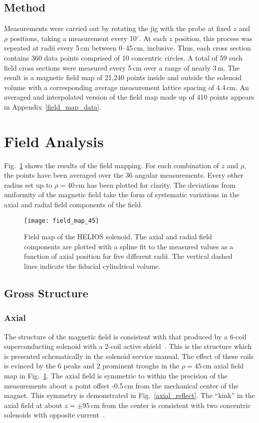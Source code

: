 \subsection{Method}
Measurements were carried out by rotating the jig with the probe at fixed $z$ and $\rho$ positions, taking a measurement every 10$^\circ$.  At each $z$ position, this process was repeated at radii every 5\,cm between 0--45\,cm, inclusive.  Thus, each cross section contains 360 data points comprised of 10 concentric circles.  A total of 59 such field cross sections were measured every 5\,cm over a range of nearly 3\,m.  The result is a magnetic field map of 21,240 points inside and outside the solenoid volume with a corresponding average measurement lattice spacing of 4.4\,cm.  An averaged and interpolated version of the field map made up of 410 points appears in Appendix~\ref{field_map_data}.
 
\section{Field Analysis}
Fig.~\ref{map} shows the results of the field mapping.  For each combination of $z$ and $\rho$, the points have been averaged over the 36 angular measurements.  Every other radius set up to $\rho=40$\,cm has been plotted for clarity.  The deviations from uniformity of the magnetic field take the form of systematic variations in the axial and radial field components of the field.    

\begin{figure}%
\centering
\texttt{[image: field\_map\_45]}%
\caption[Field map of the HELIOS solenoid]{Field map of the HELIOS solenoid.  The axial and radial field components are plotted with a spline fit to the measured values as a function of axial position for five different radii.  The vertical dashed lines indicate the fiducial cylindrical volume.}%
\label{map}%
\end{figure}

\subsection{Gross Structure}
\subsubsection{Axial}
The structure of the magnetic field is consistent with that produced by a 6-coil superconducting solenoid with a 2-coil active shield~\cite{Montgomery_1969}.  This is the structure which is presented schematically in the solenoid service manual.  The effect of these coils is evinced by the 6 peaks and 2 prominent troughs in the $\rho=45$\,cm axial field map in Fig.~\ref{map}.  The axial field is symmetric to within the precision of the measurements about a point offset -0.5\,cm from the mechanical center of the magnet.  This symmetry is demonstrated in Fig.~\ref{axial_reflect}.  The ``kink'' in the axial field at about $z= \pm95$\,cm from the center is consistent with two concentric solenoids with opposite current~\cite{Montgomery_1969}.

